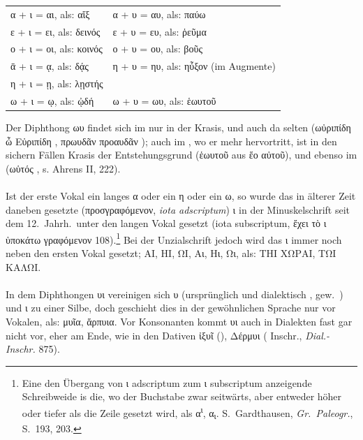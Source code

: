 \begin{center}
	\begin{tabular}[c]{ll}
		α + ι = αι, als: αἴξ    & α + υ = αυ, als: παύω                \\
		ε + ι = ει, als: δεινός & ε + υ = ευ, als: ῥεῦμα               \\
		ο + ι = οι, als: κοινός & ο + υ = ου, als: βοῦς                \\
		ᾱ + ι = ᾳ, als: δᾴς     & η + υ = ηυ, als: ηὖξον (im Augmente) \\
		η + ι = ῃ, als: λῃστής  &                                      \\
		ω + ι = ῳ, als: ᾠδή     &
		ω + υ = ωυ, als: ἑωυτοῦ                                        \\
	\end{tabular}
\end{center}


\noindent Der Diphthong ωυ findet sich im  nur in der Krasis, und auch
da selten (ωὐριπίδη ὦ Εὐριπίδη , πρωυδᾶν προαυδᾶν
); auch im , wo er mehr hervortritt, ist in den
sichern Fällen Krasis der Entstehungsgrund (ἑωυτοῦ aus ἕο αὐτοῦ), und ebenso im
 (ωὑτός , s. Ahrens II, 222).

\paragraph{} Ist der erste Vokal ein langes α oder ein η oder ein ω, so wurde
das in älterer Zeit daneben gesetzte (προσγραφόμενον, \emph{iota adscriptum}) ι in der
Minuskelschrift seit dem 12.\ Jahrh.\ unter den langen Vokal gesetzt (iota
subscriptum, ἔχει τὸ ι ὑποκάτω γραφόμενον 
108).\footnote{%
	Eine den Übergang von ι adscriptum zum ι subscriptum anzeigende Schreibweide is
	die, wo der Buchstabe zwar seitwärts, aber entweder höher oder tiefer als die
	Zeile gesetzt wird, als α\textsuperscript{ι}, α\textsubscript{ι}. S.\
	Gardthausen, \emph{Gr.\ Paleogr.}, S.\ 193, 203.
}
Bei der Unzialschrift jedoch wird das ι immer noch neben den ersten Vokal gesetzt; ΑΙ, ΗΙ, ΩΙ, Αι, Ηι, Ωι, als: ΤΗΙ ΧΩΡΑΙ, ΤΩΙ ΚΑΛΩΙ.

\paragraph{} In dem Diphthongen υι vereinigen sich υ (ursprünglich und
dialektisch \ipa{u}, gew.\ \ipa{ü}) und ι zu einer Silbe, doch geschieht dies in der
gewöhnlichen Sprache nur vor Vokalen, als: μυῖα, ἅρπυια. Vor Konsonanten kommt
υι auch in Dialekten fast gar nicht vor, eher am Ende, wie in den Dativen ἰξυῖ
(\glsxtrshort{Homerus}), Δέρμυι (\glsxtrshort{böot} Inschr., \emph{Dial.- Inschr.} 875).

